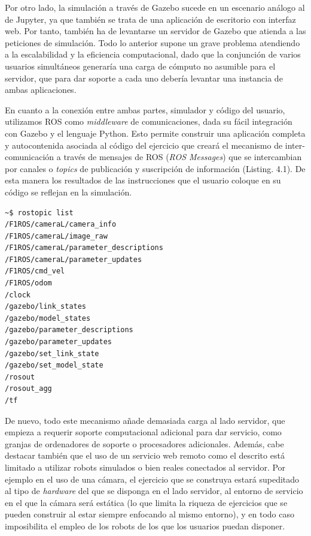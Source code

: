 Por otro lado, la simulación a través de Gazebo sucede en un escenario análogo al de Jupyter, ya que también se trata de una aplicación de escritorio con interfaz web. Por tanto, también ha de levantarse un servidor de Gazebo que atienda a las peticiones de simulación. Todo lo anterior supone un grave problema atendiendo a la escalabilidad y la eficiencia computacional, dado que la conjunción de varios usuarios simultáneos generaría una carga de cómputo no asumible para el servidor, que para dar soporte a cada uno debería levantar una instancia de ambas aplicaciones.

En cuanto a la conexión entre ambas partes, simulador y código del usuario, utilizamos ROS como \textit{middleware} de comunicaciones, dada su fácil integración con Gazebo y el lenguaje Python. Esto permite construir una aplicación completa y autocontenida asociada al código del ejercicio que creará el mecanismo de inter-comunicación a través de mensajes de ROS (\textit{ROS Messages}) que se intercambian por canales o \textit{topics} de publicación y suscripción de información (Listing. 4.1). De esta manera los resultados de las instrucciones que el usuario coloque en su código se reflejan en la simulación.

\begin{lstlisting}[language=bash, caption=Topics de ROS asociados a los Canales de Comunicación Internos]
~$ rostopic list
/F1ROS/cameraL/camera_info
/F1ROS/cameraL/image_raw
/F1ROS/cameraL/parameter_descriptions
/F1ROS/cameraL/parameter_updates
/F1ROS/cmd_vel
/F1ROS/odom
/clock
/gazebo/link_states
/gazebo/model_states
/gazebo/parameter_descriptions
/gazebo/parameter_updates
/gazebo/set_link_state
/gazebo/set_model_state
/rosout
/rosout_agg
/tf
\end{lstlisting}

De nuevo, todo este mecanismo añade demasiada carga al lado servidor, que empieza a requerir soporte computacional adicional para dar servicio, como granjas de ordenadores de soporte o procesadores adicionales. Además, cabe destacar también que el uso de un servicio web remoto como el descrito está limitado a utilizar robots simulados o bien reales conectados al servidor. Por ejemplo en el uso de una cámara, el ejercicio que se construya estará supeditado al tipo de \textit{hardware} del que se disponga en el lado servidor, al entorno de servicio en el que la cámara será estática (lo que limita la riqueza de ejercicios que se pueden construir al estar siempre enfocando al mismo entorno), y en todo caso imposibilita el empleo de los robots de los que los usuarios puedan disponer.

